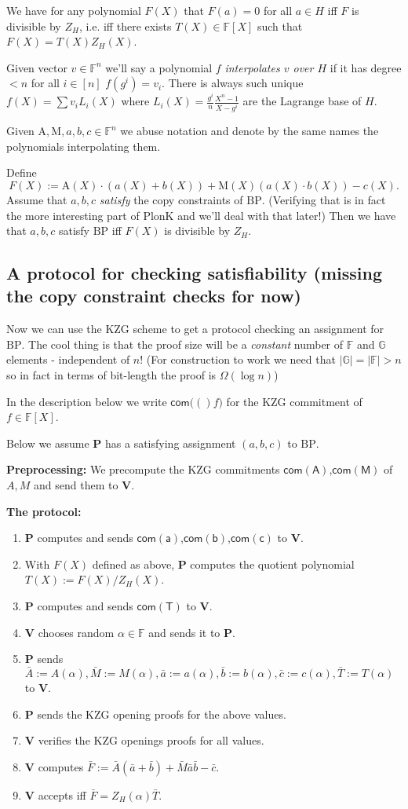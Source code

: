 \documentclass[11pt]{article} %
\newcommand{\G}{\ensuremath{{\mathbb G}}\xspace}
\newcommand{\F}{\ensuremath{\mathbb F}\xspace}
\newcommand{\com}[1]{\ensuremath{\mathsf{com(#1)}}\xspace}
\newcommand{\defeq}{:=}
\newcommand{\prv}{\ensuremath{\mathsf{\mathbf{P}}}\xspace}
\newcommand{\ver}{\ensuremath{\mathsf{\mathbf{V}}}\xspace}
\newcommand{\polys}{\ensuremath{\F[X]}\xspace}
\newcommand{\add}{\ensuremath{\mathrm{A}}\xspace}
\newcommand{\mul}{\ensuremath{\mathrm{M}}\xspace}
\newcommand{\prog}{\ensuremath{\mathrm{BP}}\xspace}
\begin{document}
We have for any polynomial $F(X)$ that 
$F(a)=0$ for all $a\in H$ iff $F$ is divisible by $Z_H$, i.e. iff there exists $T(X)\in \polys$ such that $F(X)=T(X)Z_H(X)$.

Given vector $v\in \F^n$ we'll say a polynomial $f$ \emph{interpolates $v$ over $H$} if it has degree $<n$
for all $i\in [n]$ $f(g^i)=v_i$.
There is always such unique $f(X)=\sum v_i L_i(X)$ where $L_i(X)=\frac{g^i}{n} \frac{X^n-1}{X-g^i}$ are the Lagrange base of $H$.

Given $\add,\mul,a,b,c \in \F^n$ we abuse notation and denote by the same names the polynomials interpolating them.

Define 
  \[F(X)\defeq \add(X) \cdot (a(X)+b(X)) + \mul(X)(a(X)\cdot b(X)) -c(X).\]
Assume that $a,b,c$ \emph{satisfy} the copy constraints of \prog.
(Verifying that is in fact the more interesting part of PlonK and we'll deal with that later!)
Then we have that $a,b,c$ satisfy \prog iff $F(X)$ is divisible by $Z_H$.


\subsection{A protocol for checking satisfiability (missing the copy constraint checks for now)}
Now we can use the KZG scheme to get a protocol checking an assignment for \prog.
The cool thing is that the proof size will be a \emph{constant} number of \F and \G elements - independent of $n$!
(For construction to work we need that $|\G|=|\F|>n$ so in fact in terms of bit-length the proof is $\Omega(\log n)$)

In the description below we write $\com(f)$ for the KZG commitment of $f\in \polys$.

Below we assume \prv has a satisfying assignment $(a,b,c)$ to \prog.

\textbf{Preprocessing:}
We precompute the KZG commitments \com{A},\com{M} of $A,M$ and send them to \ver.

\textbf{The protocol:}
\begin{enumerate}
 \item \prv computes and sends \com{a},\com{b},\com{c} to \ver.
 \item With $F(X)$ defined as above, \prv computes the quotient polynomial $T(X)\defeq F(X)/Z_H(X)$.
 \item \prv computes and sends \com{T} to \ver.
 \item \ver chooses random $\alpha\in \F$ and sends it to \prv.
 \item \prv sends $\bar{A}\defeq A(\alpha),\bar{M}\defeq M(\alpha),\bar{a}\defeq a(\alpha),\bar{b}\defeq b(\alpha),\bar{c}\defeq c(\alpha),\bar{T}\defeq T(\alpha)$ to \ver.
 \item \prv sends the KZG opening proofs for the above values.
 \item \ver verifies the KZG openings proofs for all values.
 \item \ver computes $\bar{F}\defeq     \bar{A}(\bar{a}+\bar{b})+\bar{M}\bar{a}\bar{b} - \bar{c}$.
 \item \ver accepts iff $\bar{F}=Z_H(\alpha)\bar{T}$.
\end{enumerate}
\end{document}
